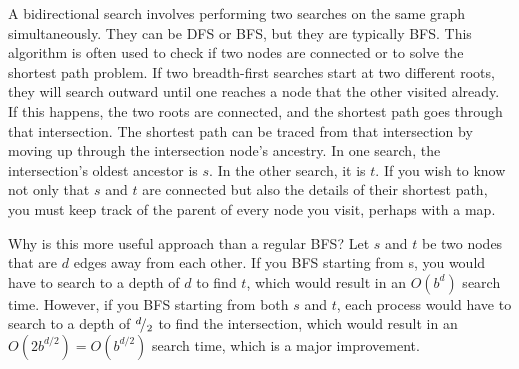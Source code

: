 A bidirectional search involves performing two searches on the same graph simultaneously. They can be DFS or BFS, but they are typically BFS. This algorithm is often used to check if two nodes are connected or to solve the shortest path problem. If two breadth-first searches start at two different roots, they will search outward until one reaches a node that the other visited already. If this happens, the two roots are connected, and the shortest path goes through that intersection. The shortest path can be traced from that intersection by moving up through the intersection node's ancestry. In one search, the intersection's oldest ancestor is $s$. In the other search, it is $t$. If you wish to know not only that $s$ and $t$ are connected but also the details of their shortest path, you must keep track of the parent of every node you visit, perhaps with a map.

Why is this more useful approach than a regular BFS? Let $s$ and $t$ be two nodes that are $d$ edges away from each other. If you BFS starting from s, you would have to search to a depth of $d$ to find $t$, which would result in an $O(b^d)$ search time. However, if you BFS starting from both $s$ and $t$, each process would have to search to a depth of ${}^{d}\!/_{2}$ to find the intersection, which would result in an $O(2b^{d/2})=O(b^{d/2})$ search time, which is a major improvement.

